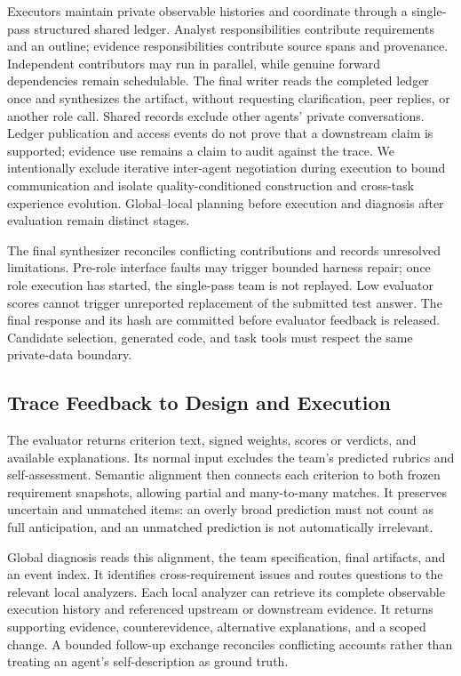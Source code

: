 \documentclass[11pt]{article}
\begin{document}
Executors maintain private observable histories and coordinate through a single-pass structured shared ledger. Analyst responsibilities contribute requirements and an outline; evidence responsibilities contribute source spans and provenance. Independent contributors may run in parallel, while genuine forward dependencies remain schedulable. The final writer reads the completed ledger once and synthesizes the artifact, without requesting clarification, peer replies, or another role call. Shared records exclude other agents' private conversations. Ledger publication and access events do not prove that a downstream claim is supported; evidence use remains a claim to audit against the trace. We intentionally exclude iterative inter-agent negotiation during execution to bound communication and isolate quality-conditioned construction and cross-task experience evolution. Global--local planning before execution and diagnosis after evaluation remain distinct stages.

The final synthesizer reconciles conflicting contributions and records unresolved limitations. Pre-role interface faults may trigger bounded harness repair; once role execution has started, the single-pass team is not replayed. Low evaluator scores cannot trigger unreported replacement of the submitted test answer. The final response and its hash are committed before evaluator feedback is released. Candidate selection, generated code, and task tools must respect the same private-data boundary.

\subsection{Trace Feedback to Design and Execution}
\label{sec:diagnosis}

The evaluator returns criterion text, signed weights, scores or verdicts, and available explanations. Its normal input excludes the team's predicted rubrics and self-assessment. Semantic alignment then connects each criterion to both frozen requirement snapshots, allowing partial and many-to-many matches. It preserves uncertain and unmatched items: an overly broad prediction must not count as full anticipation, and an unmatched prediction is not automatically irrelevant.

Global diagnosis reads this alignment, the team specification, final artifacts, and an event index. It identifies cross-requirement issues and routes questions to the relevant local analyzers. Each local analyzer can retrieve its complete observable execution history and referenced upstream or downstream evidence. It returns supporting evidence, counterevidence, alternative explanations, and a scoped change. A bounded follow-up exchange reconciles conflicting accounts rather than treating an agent's self-description as ground truth.
\end{document}
